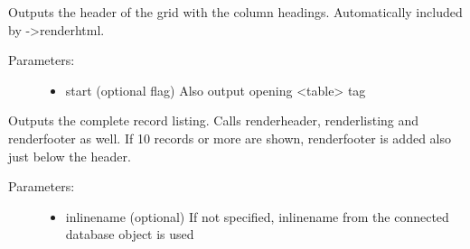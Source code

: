 \documentclass[letterpaper,10pt,english]{sphinxmanual}
\begin{document}
\begin{fulllineitems}

\begin{fulllineitems}
\label{knop_grid:knop_grid.renderheader}
\end{fulllineitems}


\begin{fulllineitems}
Outputs the header of the grid with the column headings.
Automatically included by -\textgreater{}renderhtml.
\begin{description}
\item[{Parameters:}] \leavevmode\begin{itemize}
\item {} 
start (optional flag)
Also output opening \textless{}table\textgreater{} tag

\end{itemize}

\end{description}

\end{fulllineitems}


\begin{fulllineitems}
\label{knop_grid:knop_grid.renderhtml}
\end{fulllineitems}


\begin{fulllineitems}
Outputs the complete record listing. Calls renderheader, renderlisting and renderfooter as well.
If 10 records or more are shown, renderfooter is added also just below the header.
\begin{description}
\item[{Parameters:}] \leavevmode\begin{itemize}
\item {} 
inlinename (optional)
If not specified, inlinename from the connected database object is used


\end{itemize}
\end{description}
\end{fulllineitems}
\end{fulllineitems}
\end{document}
